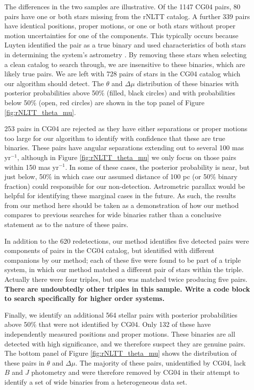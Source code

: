 \documentclass[usenatbib]{mnras}
\begin{document}
The differences in the two samples are illustrative. Of the 1147 CG04 pairs, 80 pairs have one or both stars missing from the rNLTT catalog. A further 339 pairs have identical positions, proper motions, or one or both stars without proper motion uncertainties for one of the components. This typically occurs because Luyten identified the pair as a true binary and used characteristics of both stars in determining the system's astrometry \citep{chaname04}. By removing these stars when selecting a clean catalog to search through, we are insensitive to these binaries, which are likely true pairs. We are left with 728 pairs of stars in the CG04 catalog which our algorithm should detect. The $\theta$ and $\Delta \mu$ distribution of these binaries with posterior probabilities above 50\% (filled, black circles) and with probabilities below 50\% (open, red circles) are shown in the top panel of Figure \ref{fig:rNLTT_theta_mu}. 


253 pairs in CG04 are rejected as they have either separations or proper motions too large for our algorithm to identify with confidence that these are true binaries. These pairs have angular separations extending out to several 100 mas yr$^{-1}$, although in Figure \ref{fig:rNLTT_theta_mu} we only focus on those pairs within 150 mas yr$^{-1}$. In some of these cases, the posterior probability is near, but just below, 50\% in which case our assumed distance of 100 pc (or 50\% binary fraction) could responsible for our non-detection. Astrometric parallax would be helpful for identifying these marginal cases in the future. As such, the results from our method here should be taken as a demonstration of how our method compares to previous searches for wide binaries rather than a conclusive statement as to the nature of these pairs.



In addition to the 620 redetections, our method identifies five detected pairs were components of pairs in the CG04 catalog, but identified with different companions by our method; each of these five were found to be part of a triple system, in which our method matched a different pair of stars within the triple. Actually there were four triples, but one was matched twice producing five pairs. {\bf There are undoubtedly other triples in this sample. Write a code block to search specifically for higher order systems.}


Finally, we identify an additional 564 stellar pairs with posterior probabilities above 50\% that were not identified by CG04. Only 132 of these have independently measured positions and proper motions. These binaries are all detected with high significance, and we therefore suspect they are genuine pairs. The bottom panel of Figure \ref{fig:rNLTT_theta_mu} shows the distribution of these pairs in $\theta$ and $\Delta \mu$. The majority of these pairs, unidentified by CG04, lack $B$ and $J$ photometry and were therefore removed by CG04 in their attempt to identify a set of wide binaries from a heterogeneous data set.
\end{document}
